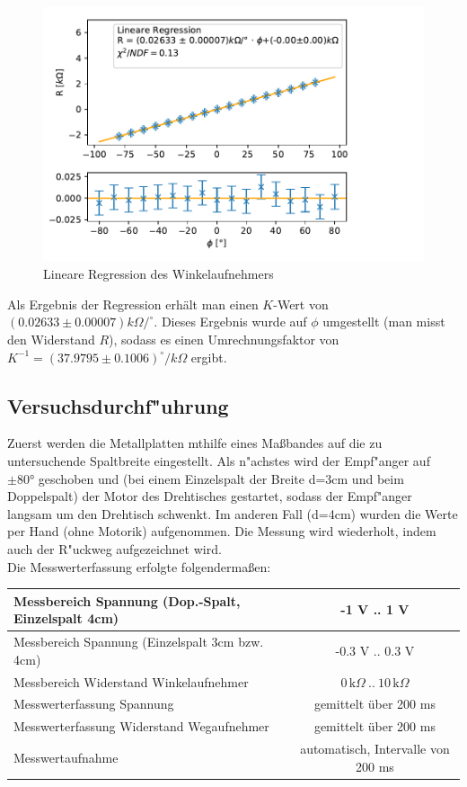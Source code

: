 \documentclass[12pt,a4paper]{article}
\begin{document}
\begin{figure}[H]
	\centering
	\includegraphics[width=0.7\linewidth]{Rohdaten/Images/Winkelkalib}
	\caption{Lineare Regression des Winkelaufnehmers}
	\label{fig:winkelkalib}
\end{figure}

Als Ergebnis der Regression erhält man einen $K$-Wert von $(0.02633\pm0.00007)k\Omega/^\circ$. Dieses Ergebnis wurde auf $\phi$ umgestellt (man misst den Widerstand $R$), sodass es einen Umrechnungsfaktor von $K^{-1} =(37.9795\pm0.1006)^\circ/k\Omega$ ergibt.




\subsection{Versuchsdurchf"uhrung}
Zuerst werden die Metallplatten mthilfe eines Ma\ss bandes auf die zu untersuchende Spaltbreite eingestellt.
Als n"achstes wird der Empf"anger auf $\pm\ang{80}$ geschoben und (bei einem Einzelspalt der Breite d=3cm und beim Doppelspalt) der Motor des Drehtisches gestartet, sodass der Empf"anger langsam um den Drehtisch schwenkt. Im anderen Fall (d=4cm) wurden die Werte per Hand (ohne Motorik) aufgenommen. Die Messung wird wiederholt, indem auch der R"uckweg aufgezeichnet wird.\\
Die Messwerterfassung erfolgte folgenderma\ss en:
\begin{table}[H]
	\centering
	\begin{tabular}{|l|c|}
		\hline 
		Messbereich Spannung (Dop.-Spalt, Einzelspalt 4cm)  & -1 V .. 1 V \\ 
		\hline 
		Messbereich Spannung (Einzelspalt 3cm bzw. 4cm)  & -0.3 V .. 0.3 V \\ 
		\hline 
		Messbereich Widerstand Winkelaufnehmer & $0\,\text{k}\Omega\ ..\ 10\,\text{k}\Omega$\\ 
		\hline 
		Messwerterfassung Spannung & gemittelt über 200 ms \\ 
		\hline
		Messwerterfassung Widerstand Wegaufnehmer & gemittelt über 200 ms \\ 
		\hline 
		Messwertaufnahme & automatisch, Intervalle von 200 ms \\ 
		\hline 

	\end{tabular} 
	\label{tab:MessparameterAllgemein}
\end{table}
\end{document}
